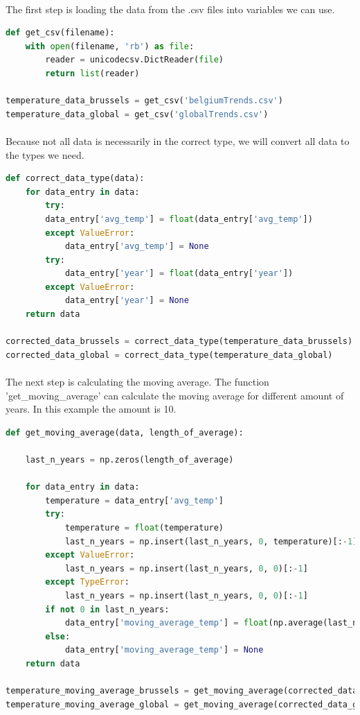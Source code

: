 \documentclass{article}
\begin{document}
\paragraph{}
The first step is loading the data from the .csv files into variables we can use.
\begin{lstlisting}[language=Python]
def get_csv(filename):
    with open(filename, 'rb') as file:
        reader = unicodecsv.DictReader(file)
        return list(reader)

temperature_data_brussels = get_csv('belgiumTrends.csv')
temperature_data_global = get_csv('globalTrends.csv')
\end{lstlisting}

\paragraph{}
Because not all data is necessarily in the correct type, we will convert all data to the types we need.
\begin{lstlisting}[language=Python]
def correct_data_type(data):
	for data_entry in data:
		try:
		data_entry['avg_temp'] = float(data_entry['avg_temp'])
		except ValueError:
			data_entry['avg_temp'] = None
		try:
			data_entry['year'] = float(data_entry['year'])
		except ValueError:
			data_entry['year'] = None
	return data

corrected_data_brussels = correct_data_type(temperature_data_brussels)
corrected_data_global = correct_data_type(temperature_data_global)
\end{lstlisting}

\paragraph{}
The next step is calculating the moving average. The function 'get\_moving\_average' can calculate the moving average for different amount of years. In this example the amount is 10.
\begin{lstlisting}[language=Python]
def get_moving_average(data, length_of_average):
	
	last_n_years = np.zeros(length_of_average)

	for data_entry in data:
		temperature = data_entry['avg_temp']
		try:
			temperature = float(temperature)
			last_n_years = np.insert(last_n_years, 0, temperature)[:-1]
		except ValueError:
			last_n_years = np.insert(last_n_years, 0, 0)[:-1]
		except TypeError:
			last_n_years = np.insert(last_n_years, 0, 0)[:-1]
		if not 0 in last_n_years:
			data_entry['moving_average_temp'] = float(np.average(last_n_years))
		else:
			data_entry['moving_average_temp'] = None
	return data

temperature_moving_average_brussels = get_moving_average(corrected_data_brussels, 10)
temperature_moving_average_global = get_moving_average(corrected_data_global, 10)
\end{lstlisting}
\end{document}
